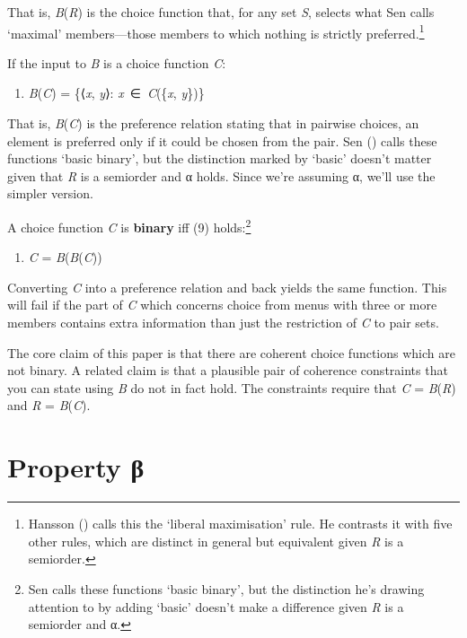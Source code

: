 \documentclass[
  11pt,
  letterpaper,
  DIV=11,
  numbers=noendperiod,
  twoside]{scrartcl}
\providecommand{\tightlist}{%
  \setlength{\itemsep}{0pt}\setlength{\parskip}{0pt}}
\begin{document}
That is, \emph{B}(\emph{R}) is the choice function that, for any set
\emph{S}, selects what Sen calls `maximal' members---those members to
which nothing is strictly preferred.\footnote{Hansson
  () calls this the `liberal
  maximisation' rule. He contrasts it with five other rules, which are
  distinct in general but equivalent given \emph{R} is a semiorder.}

If the input to \emph{B} is a choice function \emph{C}:

\begin{enumerate}
\def\labelenumi{(\arabic{enumi})}
\setcounter{enumi}{7}
\tightlist
\item
  \emph{B}(\emph{C}) = \{⟨\emph{x}, \emph{y}⟩:
  \emph{x}~∈~\emph{C}(\{\emph{x}, \emph{y}\})\}
\end{enumerate}

That is, \emph{B}(\emph{C}) is the preference relation stating that in
pairwise choices, an element is preferred only if it could be chosen
from the pair. Sen ()
calls these functions `basic binary', but the distinction marked by
`basic' doesn't matter given that \emph{R} is a semiorder and α holds.
Since we're assuming α, we'll use the simpler version.

A choice function \emph{C} is \textbf{binary} iff (9) holds:\footnote{Sen
  calls these functions `basic binary', but the distinction he's drawing
  attention to by adding `basic' doesn't make a difference given
  \emph{R} is a semiorder and α.}

\begin{enumerate}
\def\labelenumi{(\arabic{enumi})}
\setcounter{enumi}{8}
\tightlist
\item
  \emph{C} = \emph{B}(\emph{B}(\emph{C}))
\end{enumerate}

Converting \emph{C} into a preference relation and back yields the same
function. This will fail if the part of \emph{C} which concerns choice
from menus with three or more members contains extra information than
just the restriction of \emph{C} to pair sets.

The core claim of this paper is that there are coherent choice functions
which are not binary. A related claim is that a plausible pair of
coherence constraints that you can state using \emph{B} do not in fact
hold. The constraints require that \emph{C} = \emph{B}(\emph{R}) and
\emph{R} = \emph{B}(\emph{C}).

\section{Property β}\label{property-ux3b2}
\end{document}
